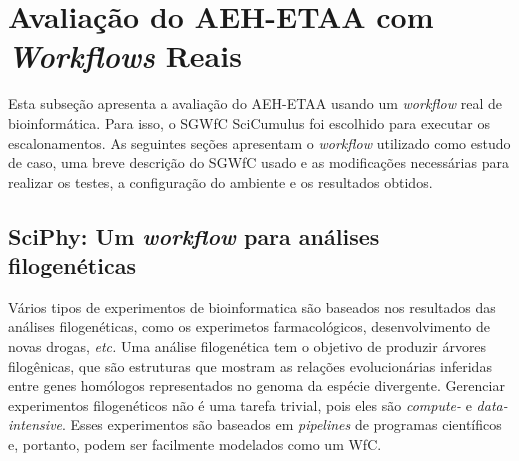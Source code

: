 \section{Avaliação do AEH-ETAA com \textit{Workflows} Reais}

Esta subseção apresenta a avaliação do AEH-ETAA usando um \textit{workflow} real de bioinformática. Para isso, o SGWfC SciCumulus foi escolhido para executar os escalonamentos. As seguintes seções apresentam o \textit{workflow} utilizado como estudo de caso, uma breve descrição do SGWfC usado e as modificações necessárias para realizar os testes, a configuração do ambiente e os resultados obtidos.


\subsection{SciPhy: Um \textit{workflow} para análises filogenéticas}

Vários tipos de experimentos de bioinformatica são baseados nos resultados das análises filogenéticas, como os experimetos farmacológicos, desenvolvimento de novas drogas, \textit{etc.} Uma análise filogenética tem o objetivo de produzir árvores filogênicas, que são estruturas que mostram as relações evolucionárias inferidas entre genes homólogos representados no genoma da espécie divergente. Gerenciar experimentos filogenéticos não é uma tarefa trivial, pois eles são \textit{compute-} e \textit{data-intensive}. Esses experimentos são baseados em \textit{pipelines} de programas científicos e, portanto, podem ser facilmente modelados como um WfC.


